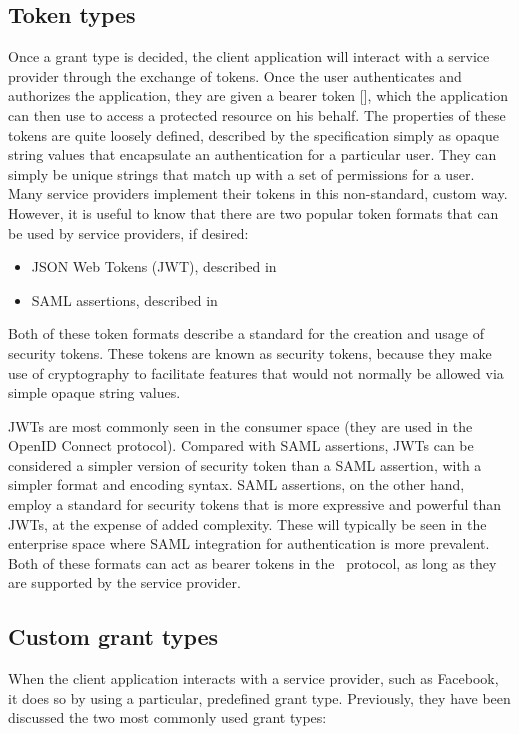 \subsection{Token types}
Once a grant type is decided, the client application will interact with a service provider through the exchange of tokens. Once the user authenticates and authorizes the application, they are given a bearer token [], which the application can then use to access a protected resource on his behalf. The properties of these tokens are quite loosely defined, described by the specification simply as opaque string values that encapsulate an authentication for a particular user. They can simply be unique strings that match up with a set of permissions for a user. Many service providers implement their tokens in this non-standard, custom way. However, it is useful to know that there are two popular token formats that can be used by service providers, if desired:

\begin{itemize}
    \item JSON Web Tokens (JWT), described in  \cite{RFC7519}
    \item SAML assertions, described in 
\end{itemize}

Both of these token formats describe a standard for the creation and usage of security tokens. These tokens are known as security tokens, because they make use of cryptography to facilitate features that would not normally be allowed via simple opaque string values.

JWTs are most commonly seen in the consumer space (they are used in the OpenID Connect protocol). Compared with SAML assertions, JWTs can be considered a simpler version of security token than a SAML assertion, with a simpler format and encoding syntax. SAML assertions, on the other hand, employ a standard for security tokens that is more expressive and powerful than JWTs, at the expense of added complexity. These will typically be seen in the enterprise space where SAML integration for authentication is more prevalent. Both of these formats can act as bearer tokens in the \oauth\ protocol, as long as they are supported by the service provider.

\subsection{Custom grant types}
When the client application interacts with a service provider, such as Facebook, it does so by using a particular, predefined grant type. Previously, they have been discussed the two most commonly used grant types:


